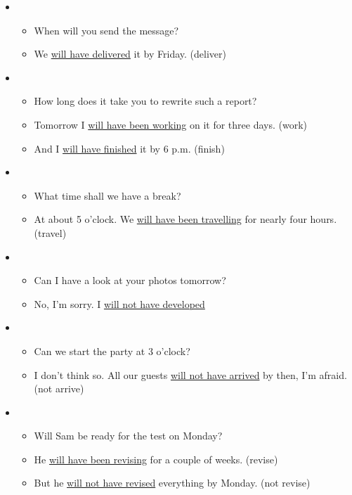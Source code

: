 \begin{itemize}

\item
\begin{itemize}
\item When will you send the message?
\item We \underline{will have delivered} it by Friday. (deliver)
\end{itemize}

\item 
\begin{itemize}
\item How long does it take you to rewrite such a report?
\item Tomorrow I \underline{will have been working} on it for three days. (work)
\item And I \underline{will have finished} it by 6 p.m. (finish)
\end{itemize}

\item 
\begin{itemize}
\item What time shall we have a break?
\item At about 5 o'clock. We \underline{will have been travelling} for nearly four hours. (travel)
\end{itemize}

\item
\begin{itemize}
\item Can I have a look at your photos tomorrow? 
\item No, I'm sorry. I \underline{will not have developed}
\end{itemize}

\item
\begin{itemize}
\item Can we start the party at 3 o'clock?
\item I don't think so. All our guests \underline{will not have arrived} by then, I'm afraid. (not arrive)
\end{itemize}

\item
\begin{itemize}
\item Will Sam be ready for the test on Monday?
\item He \underline{will have been revising} for a couple of weeks. (revise) 
\item But he \underline{will not have revised}  everything by Monday. (not revise) 
\end{itemize}

\end{itemize}


